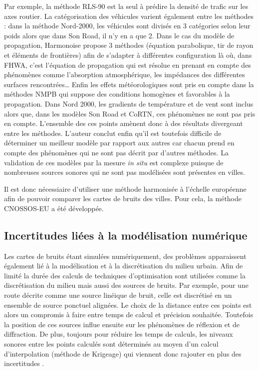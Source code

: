 Par exemple, la méthode RLS-90 est la seul à prédire la densité de trafic sur les axes routier. La catégorisation des véhicules varient également entre les méthodes : dans la méthode Nord-2000, les véhicules sont divisés en 3 catégories selon leur poids alors que dans Son Road, il n'y en a que 2. Dans le cas du modèle de propagation, Harmonoise propose 3 méthodes (équation parabolique, tir de rayon et éléments de frontières) afin de s'adapter à différentes configuration là où, dans FHWA, c'est l'équation de propagation qui est résolue en prenant en compte des phénomènes comme l'absorption atmosphérique, les impédances des différentes surfaces rencontrées\dots{} Enfin les effets météorologiques sont pris en compte dans la méthodes NMPB qui suppose des conditions homogènes et favorables à la propagation. Dans Nord 2000, les gradients de température et de vent sont inclus alors que, dans les modèles Son Road et CoRTN, ces phénomènes ne sont pas pris en compte. L'ensemble des ces points amènent donc à des résultats divergeant entre les méthodes. 
L'auteur conclut enfin qu'il est toutefois difficile de déterminer un \og meilleur \fg{} modèle par rapport aux autres car chacun prend en compte des phénomènes qui ne sont pas décrit par d'autres méthodes. La validation de ces modèles par la mesure \textit{in situ} est complexe puisque de nombreuses sources sonores qui ne sont pas modélisées sont présentes en villes. 

Il est donc nécessiaire d'utiliser une méthode harmonisée à l'échelle européenne afin de pouvoir comparer les cartes de bruits des villes. Pour cela, la méthode CNOSSOS-EU \cite{CNOSSOS} a été développée.

\subsection{Incertitudes liées à la modélisation numérique}

Les cartes de bruits étant simulées numériquement, des problèmes apparaissent également lié à la modélisation et à la discrétisation du milieu urbain. Afin de limité la durée des calculs de techniques d'optimisation sont utilisées comme la discrétisation du milieu mais aussi des sources de bruits. Par exemple, pour une route décrite comme une source linéique de bruit, celle est discrétisé en un ensemble de source ponctuel alignées. Le choix de la distance entre ces points est alors un compromis à faire entre temps de calcul et précision souhaitée. Toutefois la position de ces sources influe ensuite sur les phénomènes de réflexion et de diffraction. De plus, toujours pour réduire les temps de calculs, les niveaux sonores entre les points calculés sont déterminés au moyen d'un calcul d'interpolation (méthode de Krigeage) qui viennent donc rajouter en plus des incertitudes \cite{van_leeuwen_noise_2015}. 

